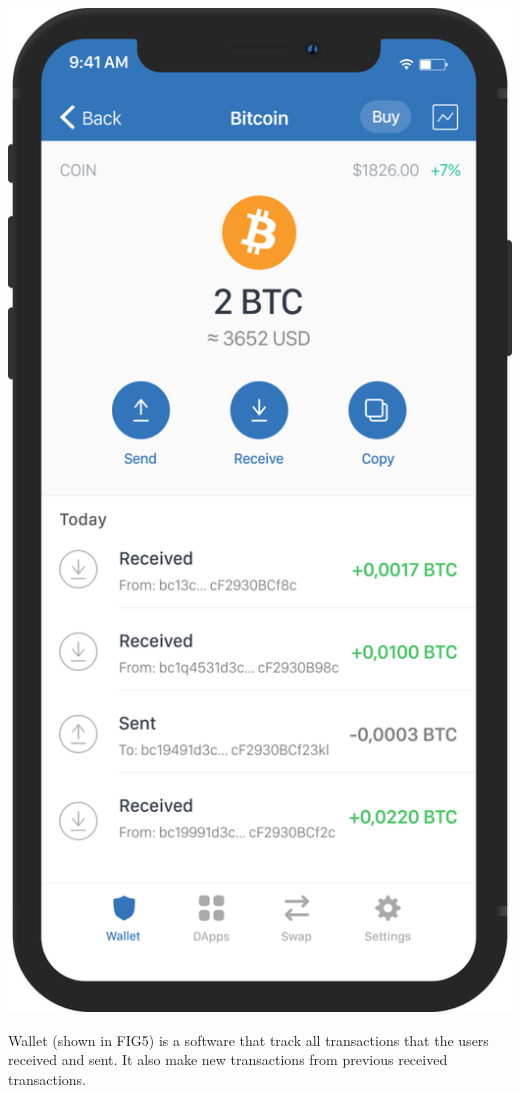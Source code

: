 \documentclass[12pt]{article}
\begin{document}
\includegraphics[width=\columnwidth/2]{imgs/wallet.png}

Wallet (shown in FIG5) is a software that track all transactions that the users received and sent.
It also make new transactions from previous received transactions.
\end{document}
